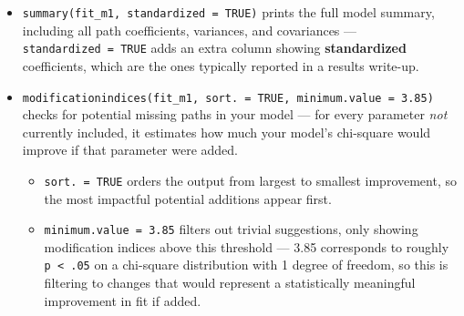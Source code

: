 \documentclass[
  letterpaper,
  DIV=11,
  numbers=noendperiod]{scrreprt}
\begin{document}
\begin{itemize}
  \begin{itemize}
  \item
    \texttt{cfi} and \texttt{tli} (Comparative Fit Index and
    Tucker-Lewis Index). Both compare the model to a baseline ``null''
    model, with values closer to 1 indicating better fit, and values
    above .95 conventionally considered good (Kline, 2015).
  \item
    \texttt{rmsea} (Root Mean Square Error of Approximation). This is a
    measure of how well the model approximates the true population
    covariance structure, with values below .06 conventionally
    considered good fit (Kline, 2015).
  \item
    \texttt{srmr} (Standardized Root Mean Square Residual). This is the
    average discrepancy between observed and model-implied correlations,
    with values below .08 conventionally considered acceptable (Hu \&
    Bentler, 1999).
  \item
    Note that the chi-square statistic and corresponding p-value is very
    sensitive to sample size (Kline, 2015).
  \end{itemize}
\item
  \texttt{summary(fit\_m1,\ standardized\ =\ TRUE)} prints the full
  model summary, including all path coefficients, variances, and
  covariances --- \texttt{standardized\ =\ TRUE} adds an extra column
  showing \textbf{standardized} coefficients, which are the ones
  typically reported in a results write-up.
\item
  \texttt{modificationindices(fit\_m1,\ sort.\ =\ TRUE,\ minimum.value\ =\ 3.85)}
  checks for potential missing paths in your model --- for every
  parameter \emph{not} currently included, it estimates how much your
  model's chi-square would improve if that parameter were added.

  \begin{itemize}
  \item
    \texttt{sort.\ =\ TRUE} orders the output from largest to smallest
    improvement, so the most impactful potential additions appear first.
  \item
    \texttt{minimum.value\ =\ 3.85} filters out trivial suggestions,
    only showing modification indices above this threshold --- 3.85
    corresponds to roughly \texttt{p\ \textless{}\ .05} on a chi-square
    distribution with 1 degree of freedom, so this is filtering to
    changes that would represent a statistically meaningful improvement
    in fit if added.
  \end{itemize}
\end{itemize}
\end{document}
